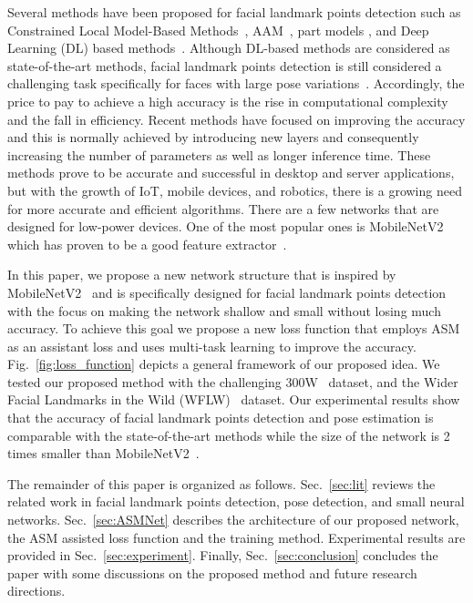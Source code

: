 \documentclass[final]{cvpr}
\begin{document}
Several methods have been proposed for facial landmark points detection such as Constrained Local Model-Based Methods~\cite{asthana2013robust, cristinacce2006feature}, AAM~\cite{cootes1998active, martins2013generative}, part models \cite{zhuramanan2012}, and Deep Learning (DL) based methods~\cite{zhang2014coarse, zhang2014facial}. Although DL-based methods are considered as state-of-the-art methods, facial landmark points detection is still considered a challenging task specifically for faces with large pose variations~\cite{dong2018style, kumar2018disentangling, wu2018look}. Accordingly, the price to pay to achieve a high accuracy is the rise in computational complexity and the fall in efficiency. Recent methods have focused on improving the accuracy and this is normally achieved by introducing new layers and consequently increasing the number of parameters as well as longer inference time. These methods prove to be accurate and successful in desktop and server applications, but with the growth of IoT, mobile devices, and robotics, there is a growing need for more accurate and efficient algorithms. There are a few networks that are designed for low-power devices. One of the most popular ones is MobileNetV2~\cite{sandler2018mobilenetv2} which has proven to be a good feature extractor~\cite{huang2017speed}.

In this paper, we propose a new network structure that is inspired by MobileNetV2~\cite{sandler2018mobilenetv2} and is specifically designed for facial landmark points detection with the focus on making the network shallow and small without losing much accuracy. To achieve this goal we propose a new loss function that employs ASM as an assistant loss and uses multi-task learning to improve the accuracy. Fig.~\ref{fig:loss_function} depicts a general framework of our proposed idea. We tested our proposed method with the challenging 300W~\cite{sagonas2013300} dataset, and the Wider Facial Landmarks in the Wild (WFLW)~\cite{wu2018look} dataset. Our experimental results show that the accuracy of facial landmark points detection and pose estimation is comparable with the state-of-the-art methods while the size of the network is 2 times smaller than MobileNetV2~\cite{sandler2018mobilenetv2}. 

The remainder of this paper is organized as follows. Sec.~\ref{sec:lit} reviews the related work in facial landmark points detection, pose detection, and small neural networks. Sec.~\ref{sec:ASMNet} describes the architecture of our proposed network, the ASM assisted loss function and the training method. Experimental results are provided in Sec.~\ref{sec:experiment}. Finally, Sec.~\ref{sec:conclusion} concludes the paper with some discussions on the proposed method and future research directions.  
\end{document}
